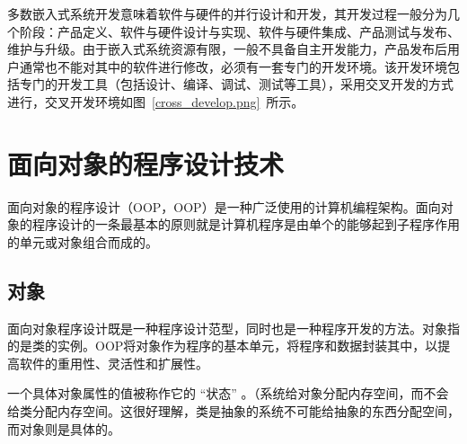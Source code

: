 \begin{enumerate}
多{\cf}数嵌{\cf}入式{\cf}系统{\cf}开发{\cf}意味{\cf}着软{\cf}件与{\cf}硬件{\cf}的并{\cf}行设{\cf}计和{\cf}开发{\cf}，其{\cf}开发{\cf}过程{\cf}一般{\cf}分为{\cf}几个{\cf}阶段{\cf}：产{\cf}品定{\cf}义、{\cf}软件{\cf}与硬{\cf}件设{\cf}计与{\cf}实现{\cf}、软{\cf}件与{\cf}硬件{\cf}集成{\cf}、产{\cf}品测{\cf}试与{\cf}发布{\cf}、维{\cf}护与{\cf}升级{\cf}。由{\cf}于嵌{\cf}入式{\cf}系统{\cf}资源{\cf}有限{\cf}，一{\cf}般不{\cf}具备{\cf}自主{\cf}开发{\cf}能力{\cf}，产{\cf}品发{\cf}布后{\cf}用户{\cf}通常{\cf}也不{\cf}能对{\cf}其中{\cf}的软{\cf}件进{\cf}行修{\cf}改，{\cf}必须{\cf}有一{\cf}套专{\cf}门的{\cf}开发{\cf}环境{\cf}。该{\cf}开发{\cf}环境{\cf}包括{\cf}专门{\cf}的开{\cf}发工{\cf}具（{\cf}包括{\cf}设计{\cf}、编{\cf}译、{\cf}调试{\cf}、测{\cf}试等{\cf}工具{\cf}），{\cf}采用{\cf}交叉{\cf}开发{\cf}的方{\cf}式进{\cf}行，{\cf}交叉开发环境如图~\ref{cross_develop.png}~所示。
\end{enumerate}

\section{面向对象的程序设计技术}
面{\cf}向对{\cf}象的{\cf}程序{\cf}设计（\acrlong{OOP}，\acrshort{OOP}）是{\cf}一种{\cf}广泛{\cf}使用{\cf}的计{\cf}算机{\cf}编程{\cf}架构{\cf}。面{\cf}向对{\cf}象的{\cf}程序{\cf}设计{\cf}的一{\cf}条最{\cf}基本{\cf}的原{\cf}则就{\cf}是计{\cf}算机{\cf}程序{\cf}是由{\cf}单个{\cf}的能{\cf}够起{\cf}到子{\cf}程序{\cf}作用{\cf}的单{\cf}元或{\cf}对象{\cf}组合{\cf}而成的。

\subsection{对象}
面{\cf}向对{\cf}象程{\cf}序设{\cf}计既{\cf}是一{\cf}种程{\cf}序设{\cf}计范{\cf}型，{\cf}同时{\cf}也是{\cf}一种{\cf}程序{\cf}开发{\cf}的方{\cf}法。{\cf}对象{\cf}指的{\cf}是类{\cf}的实例。\acrshort{OOP}将对{\cf}象作{\cf}为程{\cf}序的{\cf}基本{\cf}单元{\cf}，将{\cf}程序{\cf}和数{\cf}据封{\cf}装其{\cf}中，{\cf}以提{\cf}高软{\cf}件的{\cf}重用{\cf}性、{\cf}灵活{\cf}性和{\cf}扩展{\cf}性。

一{\cf}个具{\cf}体对{\cf}象属{\cf}性的{\cf}值被{\cf}称作{\cf}它的{\cf} “状{\cf}态” {\cf}。（{\cf}系统{\cf}给对{\cf}象分{\cf}配内{\cf}存空{\cf}间，{\cf}而不{\cf}会给{\cf}类分{\cf}配内{\cf}存空{\cf}间。{\cf}这很{\cf}好理{\cf}解，{\cf}类是{\cf}抽象{\cf}的系{\cf}统不{\cf}可能{\cf}给抽{\cf}象的{\cf}东西{\cf}分配{\cf}空间{\cf}，而{\cf}对象{\cf}则是{\cf}具体{\cf}的。

